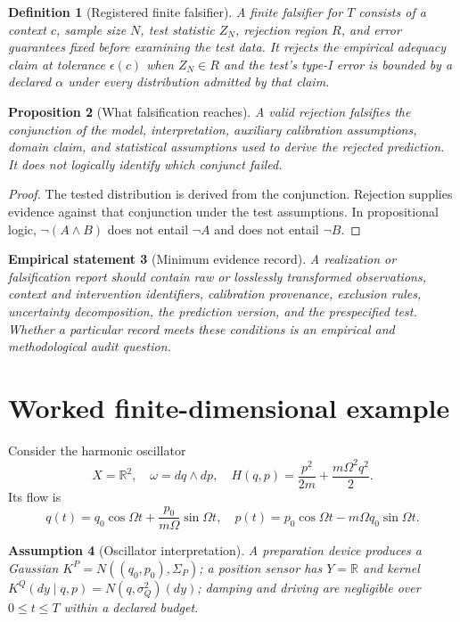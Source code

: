 \documentclass[11pt]{article}
\newtheorem{definition}{Definition}[section]
\newtheorem{assumption}[definition]{Assumption}
\newtheorem{proposition}[definition]{Proposition}
\newtheorem{empirical}[definition]{Empirical statement}
\newcommand{\R}{\mathbb R}
\begin{document}
\begin{definition}[Registered finite falsifier]
A finite falsifier for $T$ consists of a context $c$, sample size $N$, test statistic $Z_N$, rejection region $R$, and error guarantees fixed before examining the test data.  It rejects the empirical adequacy claim at tolerance $\epsilon(c)$ when $Z_N\in R$ and the test's type-I error is bounded by a declared $\alpha$ under every distribution admitted by that claim.
\end{definition}

\begin{proposition}[What falsification reaches]
A valid rejection falsifies the conjunction of the model, interpretation, auxiliary calibration assumptions, domain claim, and statistical assumptions used to derive the rejected prediction.  It does not logically identify which conjunct failed.
\end{proposition}
\begin{proof}
The tested distribution is derived from the conjunction.  Rejection supplies evidence against that conjunction under the test assumptions.  In propositional logic, $\neg(A\land B)$ does not entail $\neg A$ and does not entail $\neg B$.
\end{proof}

\begin{empirical}[Minimum evidence record]
A realization or falsification report should contain raw or losslessly transformed observations, context and intervention identifiers, calibration provenance, exclusion rules, uncertainty decomposition, the prediction version, and the prespecified test.  Whether a particular record meets these conditions is an empirical and methodological audit question.
\end{empirical}

\section{Worked finite-dimensional example}

Consider the harmonic oscillator
\[
 X=\R^2,\quad \omega=dq\wedge dp,\quad
 H(q,p)=\frac{p^2}{2m}+\frac{m\Omega^2q^2}{2}.
\]
Its flow is
\begin{equation}\label{eq:osc}
 q(t)=q_0\cos\Omega t+\frac{p_0}{m\Omega}\sin\Omega t,
 \quad
 p(t)=p_0\cos\Omega t-m\Omega q_0\sin\Omega t.
\end{equation}

\begin{assumption}[Oscillator interpretation]
A preparation device produces a Gaussian $K^P=N((q_0,p_0),\Sigma_P)$; a position sensor has $Y=\R$ and kernel $K^Q(dy\mid q,p)=N(q,\sigma_Q^2)(dy)$; damping and driving are negligible over $0\leq t\leq T$ within a declared budget.
\end{assumption}
\end{document}
